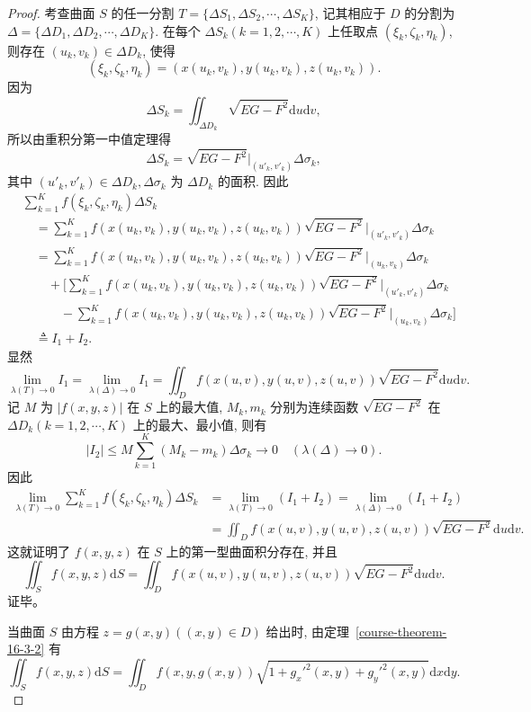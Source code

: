 \documentclass[12pt,fontset=fandol]{ctexart}
\begin{document}
\begin{proof}\quad 考查曲面 $S$ 的任一分割 $T=\{\Delta S_1,\Delta S_2,\cdots,\Delta S_K\}$, 记其相应于 $D$ 的分割为 $\Delta=\{\Delta D_1,\Delta D_2,\cdots,\Delta D_K\}$. 在每个 $\Delta S_k(k=1,2,\cdots,K)$ 上任取点 $(\xi_k,\zeta_k,\eta_k)$, 则存在 $(u_k,v_k)\in\Delta D_k$, 使得
\[
  (\xi_k,\zeta_k,\eta_k)=(x(u_k,v_k),y(u_k,v_k),z(u_k,v_k)).
\]
因为
\[
  \Delta S_k=\iint_{\Delta D_k}\sqrt{EG-F^2}\mathrm du\mathrm dv,
\]
所以由重积分第一中值定理得
\[
  \Delta S_k=\sqrt{EG-F^2}\bigg|_{(u'_k,v'_k)}\Delta\sigma_k,
\]
其中 $(u'_k,v'_k)\in\Delta D_k,\Delta\sigma_k$ 为 $\Delta D_k$ 的面积. 因此
\[
\begin{aligned}
  &\sum_{k=1}^K f(\xi_k,\zeta_k,\eta_k)\Delta S_k\\
  &\quad=\sum_{k=1}^K f(x(u_k,v_k),y(u_k,v_k),z(u_k,v_k))
    \sqrt{EG-F^2}\bigg|_{(u'_k,v'_k)}\Delta\sigma_k\\
  &\quad=\sum_{k=1}^K f(x(u_k,v_k),y(u_k,v_k),z(u_k,v_k))
    \sqrt{EG-F^2}\bigg|_{(u_k,v_k)}\Delta\sigma_k\\
  &\qquad+\bigg[
    \sum_{k=1}^K f(x(u_k,v_k),y(u_k,v_k),z(u_k,v_k))
    \sqrt{EG-F^2}\bigg|_{(u'_k,v'_k)}\Delta\sigma_k\\
  &\qquad\quad-
    \sum_{k=1}^K f(x(u_k,v_k),y(u_k,v_k),z(u_k,v_k))
    \sqrt{EG-F^2}\bigg|_{(u_k,v_k)}\Delta\sigma_k
  \bigg]\\
  &\quad\triangleq I_1+I_2.
\end{aligned}
\]
显然
\[
  \lim_{\lambda(T)\to0}I_1=\lim_{\lambda(\Delta)\to0}I_1
  =\iint_D f(x(u,v),y(u,v),z(u,v))\sqrt{EG-F^2}\mathrm du\mathrm dv.
\]
记 $M$ 为 $|f(x,y,z)|$ 在 $S$ 上的最大值, $M_k,m_k$ 分别为连续函数 $\sqrt{EG-F^2}$ 在 $\Delta D_k(k=1,2,\cdots,K)$ 上的最大、最小值, 则有
\[
  |I_2|\leqslant M\sum_{k=1}^K(M_k-m_k)\Delta\sigma_k\to0
  \quad(\lambda(\Delta)\to0).
\]
因此
\[
\begin{aligned}
  \lim_{\lambda(T)\to0}\sum_{k=1}^K f(\xi_k,\zeta_k,\eta_k)\Delta S_k
  &=\lim_{\lambda(T)\to0}(I_1+I_2)
    =\lim_{\lambda(\Delta)\to0}(I_1+I_2)\\
  &=\iint_D f(x(u,v),y(u,v),z(u,v))\sqrt{EG-F^2}\mathrm du\mathrm dv.
\end{aligned}
\]
这就证明了 $f(x,y,z)$ 在 $S$ 上的第一型曲面积分存在, 并且
\[
  \iint_S f(x,y,z)\mathrm dS
  =\iint_D f(x(u,v),y(u,v),z(u,v))\sqrt{EG-F^2}\mathrm du\mathrm dv.
\]
证毕。

当曲面 $S$ 由方程 $z=g(x,y)((x,y)\in D)$ 给出时, 由定理~\ref{course-theorem-16-3-2}  有
\[
  \iint_S f(x,y,z)\mathrm dS
  =\iint_D f(x,y,g(x,y))\sqrt{1+g_x'^2(x,y)+g_y'^2(x,y)}\mathrm dx\mathrm dy.
\]

\end{proof}
\end{document}
